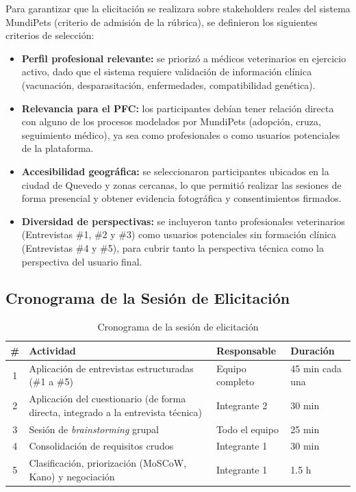 \documentclass[journal,onecolumn]{IEEEtran}
\begin{document}
Para garantizar que la elicitación se realizara sobre stakeholders reales
del sistema MundiPets (criterio de admisión de la rúbrica), se definieron
los siguientes criterios de selección:

\begin{itemize}[leftmargin=*]
  \item \textbf{Perfil profesional relevante:} se priorizó a médicos
  veterinarios en ejercicio activo, dado que el sistema requiere
  validación de información clínica (vacunación, desparasitación,
  enfermedades, compatibilidad genética).
  \item \textbf{Relevancia para el PFC:} los participantes debían tener
  relación directa con alguno de los procesos modelados por MundiPets
  (adopción, cruza, seguimiento médico), ya sea como profesionales o
  como usuarios potenciales de la plataforma.
  \item \textbf{Accesibilidad geográfica:} se seleccionaron participantes
  ubicados en la ciudad de Quevedo y zonas cercanas, lo que permitió
  realizar las sesiones de forma presencial y obtener evidencia
  fotográfica y consentimientos firmados.
  \item \textbf{Diversidad de perspectivas:} se incluyeron tanto
  profesionales veterinarios (Entrevistas \#1, \#2 y \#3) como usuarios
  potenciales sin formación clínica (Entrevistas \#4 y \#5), para cubrir
  tanto la perspectiva técnica como la perspectiva del usuario final.
\end{itemize}

\subsection{Cronograma de la Sesión de Elicitación}

\begin{table}[H]
\caption{Cronograma de la sesión de elicitación}
\label{tab:cronograma}
\begin{tabularx}{\textwidth}{|c|X|l|l|}
\hline
\textbf{\#} & \textbf{Actividad} & \textbf{Responsable} & \textbf{Duración} \\
\hline
1 & Aplicación de entrevistas estructuradas (\#1 a \#5) & Equipo completo & 45 min cada una \\
\hline
2 & Aplicación del cuestionario (de forma directa, integrado a la entrevista técnica) & Integrante 2 & 30 min \\
\hline
3 & Sesión de \textit{brainstorming} grupal & Todo el equipo & 25 min \\
\hline
4 & Consolidación de requisitos crudos & Integrante 1 & 30 min \\
\hline
5 & Clasificación, priorización (MoSCoW, Kano) y negociación & Integrante 1 & 1.5 h \\
\hline
\end{tabularx}
\end{table}
\end{document}
